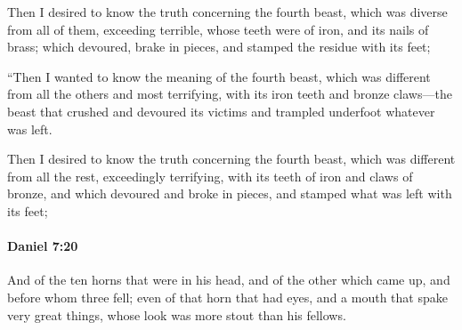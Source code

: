 			\begin{versebox}
					\item[BHS] 
					\item[LXX] 
					\item[ASV] Then I desired to know the truth concerning the fourth beast, which was diverse from all of them, exceeding terrible, whose teeth were of iron, and its nails of brass; which devoured, brake in pieces, and stamped the residue with its feet;
					\item[NIV] “Then I wanted to know the meaning of the fourth beast, which was different from all the others and most terrifying, with its iron teeth and bronze claws—the beast that crushed and devoured its victims and trampled underfoot whatever was left.
					\item[NRSV] Then I desired to know the truth concerning the fourth beast, which was different from all the rest, exceedingly terrifying, with its teeth of iron and claws of bronze, and which devoured and broke in pieces, and stamped what was left with its feet;
			\end{versebox}

		\paragraph{Daniel 7:20} %
			\label{DANIEL-7-20}

			And of the ten horns that were in his head, and of the other which came up, and before whom three fell; even of that horn that had eyes, and a mouth that spake very great things, whose look was more stout than his fellows.

